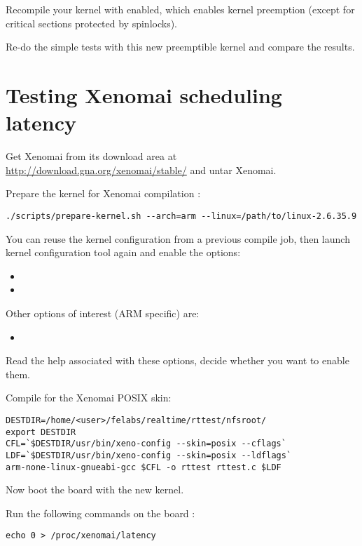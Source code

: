Recompile your kernel with  enabled, which
enables kernel preemption (except for critical sections protected by
spinlocks).

Re-do the simple tests with this new preemptible kernel and compare
the results.

\section{Testing Xenomai scheduling latency}

Get Xenomai from its download area at
\url{http://download.gna.org/xenomai/stable/} and untar Xenomai.

Prepare the kernel for Xenomai compilation :
\begin{verbatim}
./scripts/prepare-kernel.sh --arch=arm --linux=/path/to/linux-2.6.35.9
\end{verbatim}

You can reuse the kernel configuration from a previous compile job,
then launch kernel configuration tool again and enable the options:
\begin{itemize}
\item {}
\item {}
\end{itemize}

Other options of interest (ARM specific) are:
\begin{itemize}
\item {}
\end{itemize}

Read the help associated with these options, decide whether you want
to enable them.

Compile  for the Xenomai POSIX skin:

\begin{verbatim}
DESTDIR=/home/<user>/felabs/realtime/rttest/nfsroot/
export DESTDIR
CFL=`$DESTDIR/usr/bin/xeno-config --skin=posix --cflags`
LDF=`$DESTDIR/usr/bin/xeno-config --skin=posix --ldflags`
arm-none-linux-gnueabi-gcc $CFL -o rttest rttest.c $LDF
\end{verbatim}

Now boot the board with the new kernel.

Run the following commands on the board :

\begin{verbatim}
echo 0 > /proc/xenomai/latency
\end{verbatim}

